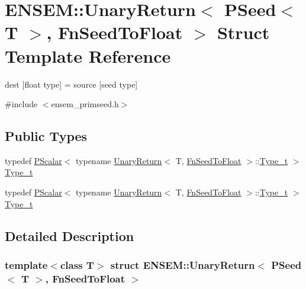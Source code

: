 \hypertarget{structENSEM_1_1UnaryReturn_3_01PSeed_3_01T_01_4_00_01FnSeedToFloat_01_4}{}\section{E\+N\+S\+EM\+:\+:Unary\+Return$<$ P\+Seed$<$ T $>$, Fn\+Seed\+To\+Float $>$ Struct Template Reference}
\label{structENSEM_1_1UnaryReturn_3_01PSeed_3_01T_01_4_00_01FnSeedToFloat_01_4}


dest \mbox{[}float type\mbox{]} = source \mbox{[}seed type\mbox{]}  




{\ttfamily \#include $<$ensem\+\_\+primseed.\+h$>$}

\subsection*{Public Types}
\begin{DoxyCompactItemize}
\item 
typedef \mbox{\hyperlink{classENSEM_1_1PScalar}{P\+Scalar}}$<$ typename \mbox{\hyperlink{structENSEM_1_1UnaryReturn}{Unary\+Return}}$<$ T, \mbox{\hyperlink{structENSEM_1_1FnSeedToFloat}{Fn\+Seed\+To\+Float}} $>$\+::\mbox{\hyperlink{structENSEM_1_1UnaryReturn_3_01PSeed_3_01T_01_4_00_01FnSeedToFloat_01_4_a0162324945d4cff5d69aa1ee87641522}{Type\+\_\+t}} $>$ \mbox{\hyperlink{structENSEM_1_1UnaryReturn_3_01PSeed_3_01T_01_4_00_01FnSeedToFloat_01_4_a0162324945d4cff5d69aa1ee87641522}{Type\+\_\+t}}
\item 
typedef \mbox{\hyperlink{classENSEM_1_1PScalar}{P\+Scalar}}$<$ typename \mbox{\hyperlink{structENSEM_1_1UnaryReturn}{Unary\+Return}}$<$ T, \mbox{\hyperlink{structENSEM_1_1FnSeedToFloat}{Fn\+Seed\+To\+Float}} $>$\+::\mbox{\hyperlink{structENSEM_1_1UnaryReturn_3_01PSeed_3_01T_01_4_00_01FnSeedToFloat_01_4_a0162324945d4cff5d69aa1ee87641522}{Type\+\_\+t}} $>$ \mbox{\hyperlink{structENSEM_1_1UnaryReturn_3_01PSeed_3_01T_01_4_00_01FnSeedToFloat_01_4_a0162324945d4cff5d69aa1ee87641522}{Type\+\_\+t}}
\end{DoxyCompactItemize}


\subsection{Detailed Description}
\subsubsection*{template$<$class T$>$\newline
struct E\+N\+S\+E\+M\+::\+Unary\+Return$<$ P\+Seed$<$ T $>$, Fn\+Seed\+To\+Float $>$}

